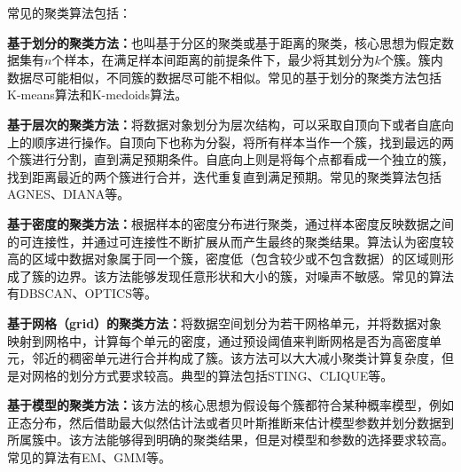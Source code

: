 常见的聚类算法包括：
\begin{compactitem}
	\item
	\textbf{基于划分的聚类方法：}也叫基于分区的聚类或基于距离的聚类，核心思想为假定数据集有$ n $个样本，在满足样本间距离的前提条件下，最少将其划分为$ k $个簇。簇内数据尽可能相似，不同簇的数据尽可能不相似。常见的基于划分的聚类方法包括K-means算法和K-medoids算法。
	\item
	\textbf{基于层次的聚类方法：}将数据对象划分为层次结构，可以采取自顶向下或者自底向上的顺序进行操作。自顶向下也称为分裂，将所有样本当作一个簇，找到最远的两个簇进行分割，直到满足预期条件。自底向上则是将每个点都看成一个独立的簇，找到距离最近的两个簇进行合并，迭代重复直到满足预期。常见的聚类算法包括AGNES、DIANA等。
	\item
	\textbf{基于密度的聚类方法：}根据样本的密度分布进行聚类，通过样本密度反映数据之间的可连接性，并通过可连接性不断扩展从而产生最终的聚类结果。算法认为密度较高的区域中数据对象属于同一个簇，密度低（包含较少或不包含数据）的区域则形成了簇的边界。该方法能够发现任意形状和大小的簇，对噪声不敏感。常见的算法有DBSCAN、OPTICS等。
	\item
	\textbf{基于网格（grid）的聚类方法：}将数据空间划分为若干网格单元，并将数据对象映射到网格中，计算每个单元的密度，通过预设阈值来判断网格是否为高密度单元，邻近的稠密单元进行合并构成了簇。该方法可以大大减小聚类计算复杂度，但是对网格的划分方式要求较高。典型的算法包括STING、CLIQUE等。
	\item
	\textbf{基于模型的聚类方法：}该方法的核心思想为假设每个簇都符合某种概率模型，例如正态分布，然后借助最大似然估计法或者贝叶斯推断来估计模型参数并划分数据到所属簇中。该方法能够得到明确的聚类结果，但是对模型和参数的选择要求较高。常见的算法有EM、GMM等。
\end{compactitem}


